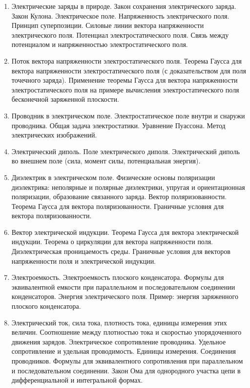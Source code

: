 \documentclass[12pt]{article}
\begin{document}
\begin{enumerate}
        \item Электрические заряды в природе. Закон сохранения электрического заряда. Закон Кулона. Электрическое поле. Напряженность электрического поля. Принцип суперпозиции. Силовые линии вектора напряженности электрического поля. Потенциал электростатического поля. Связь между потенциалом и напряженностью электростатического поля.
        \item Поток вектора напряженности электростатического поля. Теорема Гаусса для вектора напряженности электростатического поля (с доказательством для поля точечного заряда). Применение теоремы Гаусса для вектора напряженности электростатического поля на примере вычисления электростатического поля бесконечной заряженной плоскости.
        \item Проводник в электрическом поле. Электростатическое поле внутри и снаружи проводника. Общая задача электростатики. Уравнение Пуассона. Метод электрических изображений.
        \item Электрический диполь. Поле электрического диполя. Электрический диполь во внешнем поле (сила, момент силы, потенциальная энергия).
        \item Диэлектрик в электрическом поле. Физические основы поляризации диэлектрика: неполярные и полярные диэлектрики, упругая и ориентационная поляризации, образование связанного заряда. Вектор поляризованности. Теорема Гаусса для вектора поляризованности. Граничные условия для вектора поляризованности.
        \item Вектор электрической индукции. Теорема Гаусса для вектора электрической индукции. Теорема о циркуляции для вектора напряженности поля. Диэлектрическая проницаемость среды. Граничные условия для векторов напряженности поля и электрической индукции.
        \item Электроемкость. Электроемкость плоского конденсатора. Формулы для эквивалентной емкости при параллельном и последовательном соединении конденсаторов. Энергия электрического поля. Пример: энергия заряженного плоского конденсатора.
        \item Электрический ток, сила тока, плотность тока, единицы измерения этих величин. Соотношение между плотностью тока и скоростью упорядоченного движения зарядов. Электрическое сопротивление проводника. Удельное сопротивление и удельная проводимость. Единицы измерения. Соединения проводников. Формулы для эквивалентного сопротивления при параллельном и последовательном соединении. Закон Ома для однородного участка цепи в дифференциальной и интегральной формах.

\end{enumerate}
\end{document}
